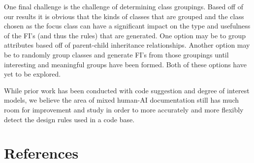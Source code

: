 \documentclass[12pt]{article}
\begin{document}
One final challenge is the challenge of determining class groupings. Based off of our results it is obvious that the kinds of classes that are grouped and the class chosen as the focus class can have a significant impact on the type and usefulness of the FI's (and thus the rules) that are generated. One option may be to group attributes based off of parent-child inheritance relationships. Another option may be to randomly group classes and generate FI's from those groupings until interesting and meaningful groups have been formed. Both of these options have yet to be explored.

While prior work has been conducted with code suggestion and degree of interest models, we believe the area of mixed human-AI documentation still has much room for improvement and study in order to more accurately and more flexibly detect the design rules used in a code base.


\clearpage

\section{References}\label{references}

\printbibliography
\end{document}

